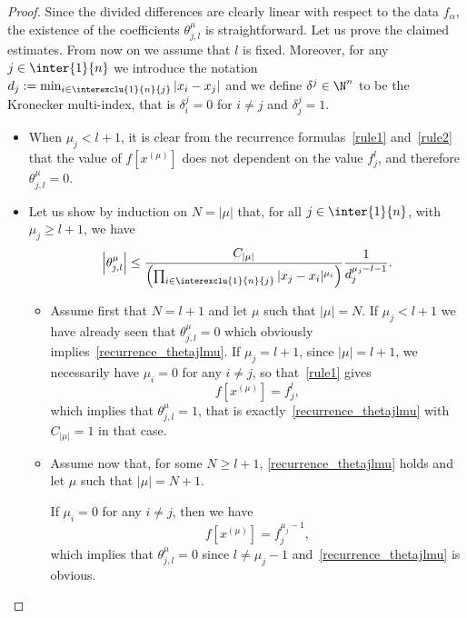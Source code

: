 \begin{proof}
Since the divided differences are clearly linear with respect to the data $f_\alpha$, the existence of the coefficients $\theta_{j,l}^\mu$ is straightforward. Let us prove the claimed estimates. From now on we assume that $l$ is fixed. Moreover, for any $j\in \inter{1}{n}$ we introduce the notation $d_j:= \min_{i\in\interexclu{1}{n}{j}} |x_i-x_j|$ and we define $\delta^j\in \N^n$ to be the Kronecker multi-index, that is $\delta_i^j=0$ for $i\neq j$ and $\delta_j^j=1$.
\begin{itemize}
\item When $\mu_j<l+1$, it is clear from the recurrence formulas~\eqref{rule1} and~\eqref{rule2} that the value of $f[x^{(\mu)}]$ does not dependent on the value $f_j^l$, and therefore $\theta_{j,l}^\mu=0$.
\item Let us show by induction on $N=|\mu|$ that, for all $j\in \inter{1}{n}$, with $\mu_j\geq l+1$, we have
\begin{equation}\label{recurrence_thetajlmu}
\left|\theta_{j,l}^\mu\right| \leq \frac{C_{|\mu|}}{\left(\prod_{i\in\interexclu{1}{n}{j}} |x_j-x_i|^{\mu_i}\right)} \frac{1}{d_j^{\mu_j-l-1}}.
\end{equation}
\begin{itemize}
\item Assume first that $N=l+1$ and let $\mu$ such that $|\mu|=N$. If $\mu_j<l+1$ we have already seen that $\theta_{j,l}^\mu=0$ which obviously implies~\eqref{recurrence_thetajlmu}. If $\mu_j=l+1$, since $|\mu|=l+1$, we necessarily have $\mu_i=0$ for any $i\neq j$, so that~\eqref{rule1} gives
\[
f\left[x^{(\mu)}\right] = f_j^l,
\]
which implies that $\theta_{j,l}^\mu=1$, that is exactly~\eqref{recurrence_thetajlmu} with $C_{|\mu|}=1$ in that case.
\item Assume now that, for some $N\geq l+1$, \eqref{recurrence_thetajlmu} holds and let $\mu$ such that $|\mu|=N+1$.

If $\mu_i=0$ for any $i\neq j$, then we have
\[
f\left[x^{(\mu)}\right] = f_j^{\mu_j-1},
\]
which implies that $\theta_{j,l}^\mu=0$ since $l\neq \mu_j-1$ and~\eqref{recurrence_thetajlmu} is obvious.


\end{itemize}
\end{itemize}
\end{proof}
